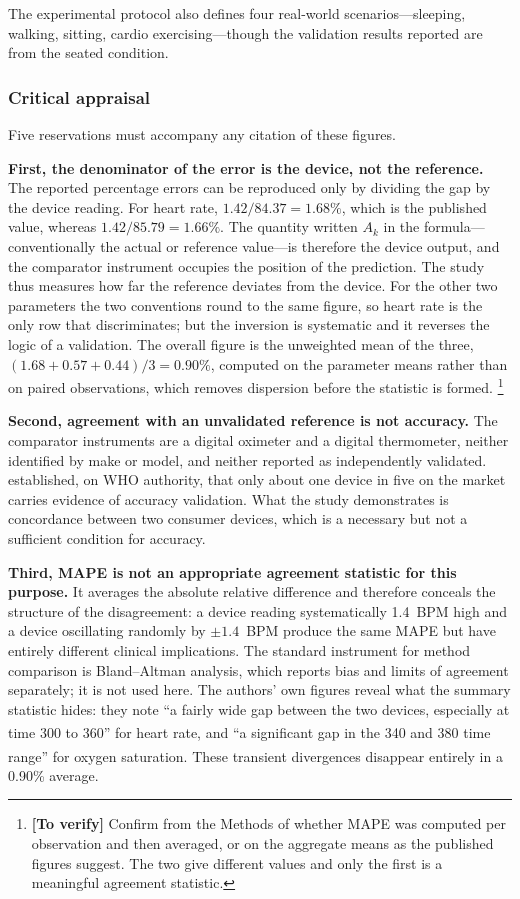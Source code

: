 \documentclass[12pt,a4paper,oneside]{report}
\newcommand{\verify}[1]{\footnote{\textbf{[To verify]} #1}}
\newcommand{\bq}[1]{``#1''\textsuperscript{\dag}}
\begin{document}
The experimental protocol also defines four real-world scenarios---sleeping, walking, sitting, cardio exercising---though the validation results reported are from the seated condition.

\subsubsection{Critical appraisal}\label{sec:efendi-appraisal}

Five reservations must accompany any citation of these figures.

\textbf{First, the denominator of the error is the device, not the reference.} The reported percentage errors can be reproduced only by dividing the gap by the device reading. For heart rate, $1.42/84.37 = 1.68\%$, which is the published value, whereas $1.42/85.79 = 1.66\%$. The quantity written $A_k$ in the formula---conventionally the actual or reference value---is therefore the device output, and the comparator instrument occupies the position of the prediction. The study thus measures how far the reference deviates from the device. For the other two parameters the two conventions round to the same figure, so heart rate is the only row that discriminates; but the inversion is systematic and it reverses the logic of a validation. The overall figure is the unweighted mean of the three, $(1.68+0.57+0.44)/3 = 0.90\%$, computed on the parameter means rather than on paired observations, which removes dispersion before the statistic is formed.%
\verify{Confirm from the Methods of \textcite{efendi2025} whether MAPE was computed per observation and then averaged, or on the aggregate means as the published figures suggest. The two give different values and only the first is a meaningful agreement statistic.}

\textbf{Second, agreement with an unvalidated reference is not accuracy.} The comparator instruments are a digital oximeter and a digital thermometer, neither identified by make or model, and neither reported as independently validated.  established, on WHO authority, that only about one device in five on the market carries evidence of accuracy validation. What the study demonstrates is concordance between two consumer devices, which is a necessary but not a sufficient condition for accuracy.

\textbf{Third, MAPE is not an appropriate agreement statistic for this purpose.} It averages the absolute relative difference and therefore conceals the structure of the disagreement: a device reading systematically 1.4~BPM high and a device oscillating randomly by $\pm 1.4$~BPM produce the same MAPE but have entirely different clinical implications. The standard instrument for method comparison is Bland--Altman analysis, which reports bias and limits of agreement separately; it is not used here. The authors' own figures reveal what the summary statistic hides: they note \bq{a fairly wide gap between the two devices, especially at time 300 to 360} for heart rate, and \bq{a significant gap in the 340 and 380 time range} for oxygen saturation. These transient divergences disappear entirely in a 0.90\% average.
\end{document}
